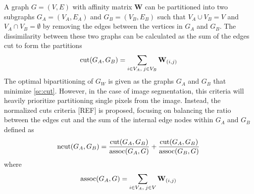 A graph $G = (V,E)$ with affinity matrix $\mathbf{W}$ can be partitioned into two subgraphs $G_A = (V_A, E_A)$ and $G_B = (V_B, E_B)$ such that $V_A \cup V_B = V$ and $V_A \cap V_B = \emptyset$ by removing the edges between the vertices in $G_A$ and $G_B$. The dissimilarity between these two graphs can be calculated as the sum of the edges cut to form the partitions
\begin{equation}
    \label{sc:cut}
    \operatorname*{\text{cut}}(G_A,G_B) = \sum_{i \in V_A,\;j \in V_B}{\mathbf{W}_{(i,j)}}
\end{equation}
The optimal bipartitioning of $G_W$ is given as the graphs $G_A$ and $G_B$ that minimize \eqref{sc:cut}. However, in the case of image segmentation, this criteria will heavily prioritize partitioning single pixels from the image. Instead, the normalized cuts criteria [REF] is proposed, focusing on balancing the ratio between the edges cut and the sum of the internal edge nodes within $G_A$ and $G_B$ defined as 
\begin{equation}
    \label{sc:ncut-criteria}
    \operatorname*{\text{ncut}}(G_A, G_B) = \frac{\operatorname*{\text{cut}}(G_A, G_B)}{\operatorname*{\text{assoc}}(G_A, G)} + \frac{\operatorname*{\text{cut}}(G_A, G_B)}{\operatorname*{\text{assoc}}(G_B, G)}
\end{equation}
where 
\begin{equation}
    \label{sc:assoc}
    \operatorname*{\text{assoc}}(G_A, G) = \sum_{i \in V_A,\;j \in V}{\mathbf{W}_{(i,j)}}
\end{equation}